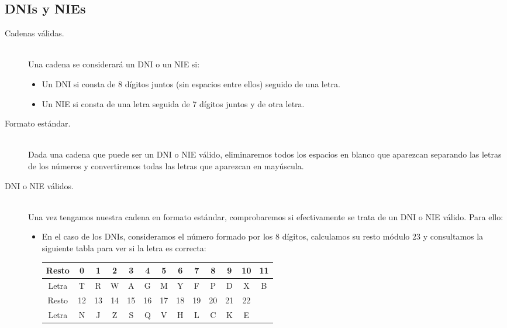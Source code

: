 \documentclass[12pt]{article}
\begin{document}
    \subsection{DNIs y NIEs}
    \begin{description}
        \item [Cadenas válidas.]~\\
            Una cadena se considerará un DNI o un NIE si:
            \begin{itemize}
                \item Un DNI si consta de 8 dígitos juntos (sin espacios entre ellos) seguido de una letra.
                \item Un NIE si consta de una letra seguida de 7 dígitos juntos y de otra letra.
            \end{itemize}
        \item [Formato estándar.]~\\
            Dada una cadena que puede ser un DNI o NIE válido, eliminaremos todos los espacios en blanco que aparezcan separando las letras de los números y convertiremos todas las letras que aparezcan en mayúscula.
        \item [DNI o NIE válidos.]~\\
            Una vez tengamos nuestra cadena en formato estándar, comprobaremos si efectivamente se trata de un DNI o NIE válido. Para ello:
            \begin{itemize}
                \item En el caso de los DNIs, consideramos el número formado por los 8 dígitos, calculamos su resto módulo 23 y consultamos la siguiente tabla para ver si la letra es correcta:
                    \begin{table}[H]
                    \centering
                    \begin{tabular}{|c|c|c|c|c|c|c|c|c|c|c|c|c|}
                        \hline
                        Resto & 0 & 1 & 2 & 3 & 4 & 5 & 6 & 7 & 8 & 9 & 10 & 11  \\
                        \hline
                        Letra & T & R & W & A & G & M & Y & F & P & D & X & B \\
                        \hline
                        \hline
                        Resto & 12 & 13 & 14 & 15 & 16 & 17 & 18 & 19 & 20 & 21 & 22 & \\
                        \hline
                        Letra & N & J & Z & S & Q & V & H & L & C & K & E&  \\

\end{tabular}
\end{table}
\end{itemize}
\end{description}
\end{document}
